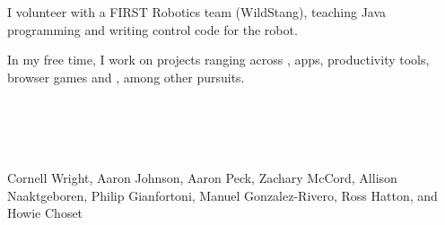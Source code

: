 \begin{resume}



\section{}
I volunteer with a FIRST Robotics team (WildStang), teaching Java programming
and writing control code for the robot.

In my free time,
I work on projects ranging across ,
 apps, productivity tools, browser games and , among
other pursuits.

\begin{formatb}
  \\
  \body\\
\end{formatb}

\section{}

Cornell Wright, Aaron Johnson, Aaron Peck, Zachary McCord, Allison Naaktgeboren, Philip Gianfortoni, Manuel Gonzalez-Rivero, Ross Hatton, and Howie Choset


\end{resume}
